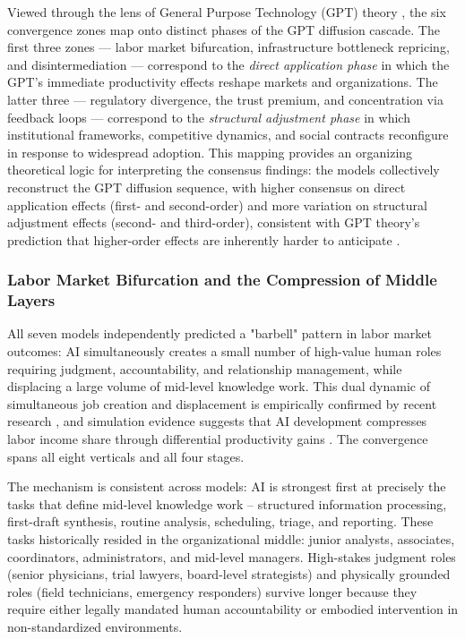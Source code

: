 \documentclass[preprint,review,12pt]{elsarticle}
\begin{document}
Viewed through the lens of General Purpose Technology (GPT) theory \citep{bresnahan1995gpt, lipsey2005gpt}, the six convergence zones map onto distinct phases of the GPT diffusion cascade. The first three zones --- labor market bifurcation, infrastructure bottleneck repricing, and disintermediation --- correspond to the \textit{direct application phase} in which the GPT's immediate productivity effects reshape markets and organizations. The latter three --- regulatory divergence, the trust premium, and concentration via feedback loops --- correspond to the \textit{structural adjustment phase} in which institutional frameworks, competitive dynamics, and social contracts reconfigure in response to widespread adoption. This mapping provides an organizing theoretical logic for interpreting the consensus findings: the models collectively reconstruct the GPT diffusion sequence, with higher consensus on direct application effects (first- and second-order) and more variation on structural adjustment effects (second- and third-order), consistent with GPT theory's prediction that higher-order effects are inherently harder to anticipate \citep{helpman1998gpt}.


\subsubsection{Labor Market Bifurcation and the Compression of Middle Layers}
\label{sec:labor_market_bifurcation}

All seven models independently predicted a "barbell" pattern in labor market outcomes: AI simultaneously creates a small number of high-value human roles requiring judgment, accountability, and relationship management, while displacing a large volume of mid-level knowledge work. This dual dynamic of simultaneous job creation and displacement is empirically confirmed by recent research \citep{acemoglu2022aijobs, choi2024ailabor}, and simulation evidence suggests that AI development compresses labor income share through differential productivity gains \citep{qian2023ailaborincome}. The convergence spans all eight verticals and all four stages.

The mechanism is consistent across models: AI is strongest first at precisely the tasks that define mid-level knowledge work -- structured information processing, first-draft synthesis, routine analysis, scheduling, triage, and reporting. These tasks historically resided in the organizational middle: junior analysts, associates, coordinators, administrators, and mid-level managers. High-stakes judgment roles (senior physicians, trial lawyers, board-level strategists) and physically grounded roles (field technicians, emergency responders) survive longer because they require either legally mandated human accountability or embodied intervention in non-standardized environments.
\end{document}
